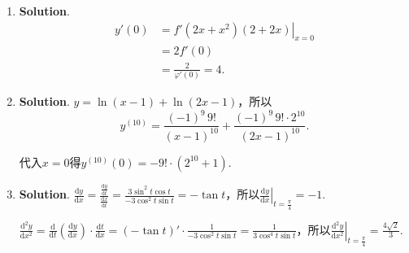 \documentclass[../Main.tex]{subfiles}
\begin{document}
\begin{enumerate}
    \item \textbf{Solution}.
          \[
              \begin{aligned}
                  y'(0) & =\left.f'(2x+x^{2})(2+2x)\right|_{x=0} \\
                        & = 2f'(0)                               \\
                        & = \frac{2}{\varphi'(0)}=4.
              \end{aligned}
          \]

    \item \textbf{Solution}. $y=\ln(x-1)+\ln(2x-1)$，所以
          \[
              y^{(10)}=\frac{(-1)^{9}\,9!}{(x-1)^{10}}+\frac{(-1)^{9}\,9!\cdot 2^{10}}{(2x-1)^{10}}
              .
          \]

          代入$x=0$得$y^{(10)}(0)=-9!\cdot(2^{10}+1)$.

    \item \textbf{Solution}. $\frac{\mathrm{d}y}{\mathrm{d}x}=\frac{\frac{\mathrm{d}y}{\mathrm{d}t}}{\frac{\mathrm{d}x}{\mathrm{d}t}}
              =\frac{3\sin^{2} t\cos t}{-3\cos^{2} t\sin t}=-\tan t$，所以$\left.\frac{\mathrm{d}y}{\mathrm{d}x}
              \right|_{t=\frac{\pi}{4}}=-1$.

          $\frac{\mathrm{d}^{2}y}{\mathrm{d}x^{2}}=\frac{\mathrm{d}}{\mathrm{d}t}\left
              (\frac{\mathrm{d}y}{\mathrm{d}x}\right)\cdot\frac{\mathrm{d}t}{\mathrm{d}x}
              =\left(-\tan t\right)'\cdot\frac{1}{-3\cos^{2} t\sin t}=\frac{1}{3\cos^{4}
                  t\sin t}$，所以$\left.\frac{\mathrm{d}^{2}y}{\mathrm{d}x^{2}}\right|_{t=\frac{\pi}{4}}
              =\frac{4\sqrt{2}}{3}$.
\end{enumerate}
\end{document}
